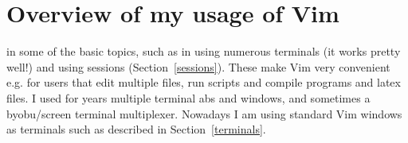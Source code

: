 \documentclass{article}
\begin{document}
\section{Overview of my usage of Vim}
in some of the basic topics, such as in using numerous terminals 
(it works pretty well!) and using sessions (Section~\ref{sessions}).
These make Vim very convenient e.g. for users that edit multiple files,
run scripts and compile programs and latex files.
I used for years multiple terminal abs and windows,
and sometimes a byobu/screen terminal multiplexer.
Nowadays I am using standard Vim windows as terminals
such as described in Section~\ref{terminals}.

\end{document}
